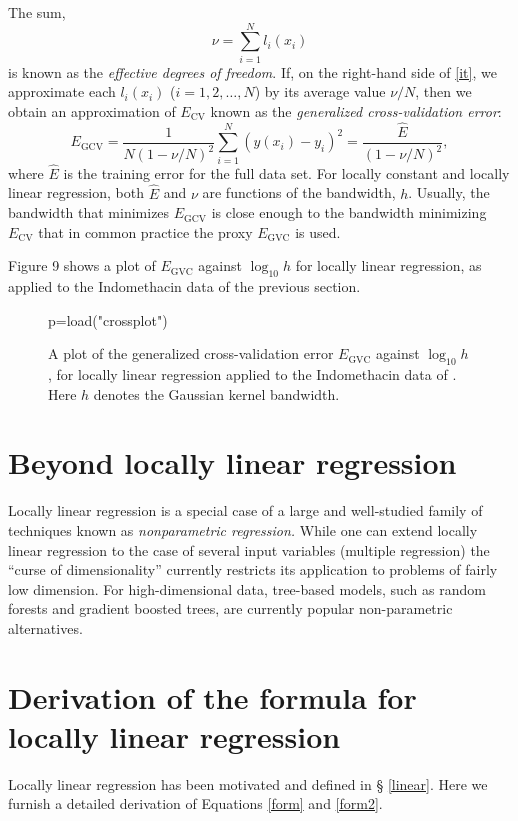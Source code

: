 \documentclass[11pt, reqno]{amsart}
\newcommand\df{\em}
\begin{document}
The sum,
\begin{equation*}
  \nu=\sum_{i=1}^N l_i(x_i)
\end{equation*}
is known as the {\df effective degrees of freedom}. If, on the
right-hand side of \eqref{it}, we approximate each $l_i(x_i)$
($i=1, 2, \ldots , N$)  by its average value $\nu/N$, then we obtain
an approximation of $E_\text{CV}$ known as the {\df generalized cross-validation error}:
\begin{equation*}
  E_\text{GCV}=\frac{1}{N(1-\nu/N)^2}\sum_{i=1}^N\left(y(x_i)-y_i\right)^2=\frac{\hat
    E}{(1-\nu/N)^2},
\end{equation*}
where $\hat E$ is the training error for the full data set.  For
locally constant and locally linear regression, both $\hat E$ and
$\nu$ are functions of the bandwidth, $h$. Usually, the bandwidth that
minimizes $E_\text{GCV}$ is close enough to the bandwidth minimizing
$E_\text{CV}$ that in common practice the proxy $E_\text{GVC}$ is
used.

Figure 9 shows a plot of $E_\text{GVC}$ against $\log_{10}h$ for
locally linear regression, as applied to the Indomethacin data of the
previous section.

\begin{figure}
  \begin{sagesilent}
     p=load("crossplot")
  \end{sagesilent}
  \centering 
  \caption{{} A plot of the generalized cross-validation
    error $E_\text{GVC}$ against $\log_{10}h$, for locally linear
    regression applied to the Indomethacin data of
    \cite{Kwan_etal_76}. Here $h$ denotes the Gaussian kernel
    bandwidth.}
\end{figure}

\section{Beyond locally linear regression}
Locally linear regression is a special case of a large and
well-studied family of techniques known as {\em nonparametric
  regression.} While one can extend locally linear regression to the
case of several input variables (multiple regression) the ``curse of
dimensionality'' currently restricts its application to problems of
fairly low dimension. For high-dimensional data, tree-based models,
such as random forests and gradient boosted trees, are currently
popular non-parametric alternatives.

\newpage
\appendix
\section{Derivation of the formula for\\ locally linear regression}
Locally linear regression has been motivated and defined in \S
\ref{linear}. Here we furnish a detailed derivation of Equations
\eqref{form} and \eqref{form2}. 
\end{document}
